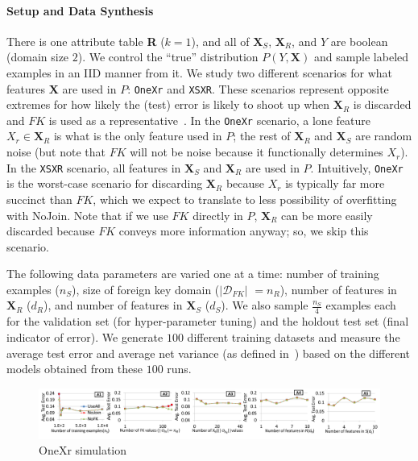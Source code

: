 \documentclass[sigconf]{acmart}
\begin{document}
\paragraph*{Setup and Data Synthesis}
There is one attribute table \textbf{R} ($k=1$), and all of $\textbf{X}_S$, $\textbf{X}_R$, and $Y$ are boolean (domain size $2$).
We control the ``true'' distribution $P(Y,\textbf{X})$ and sample labeled examples in an IID manner from it.
We study two different scenarios for what features \textbf{X} are used in $P$: \texttt{OneXr} and \texttt{XSXR}.
These scenarios represent opposite extremes for how likely the (test) error is likely to shoot up when $\textbf{X}_R$ is discarded
and $FK$ is used as a representative~\cite{hamlet}. In the \texttt{OneXr} scenario, a lone feature $X_r \in \textbf{X}_R$ is 
what is the only feature used in $P$; the rest of $\textbf{X}_R$ and $\textbf{X}_S$ are random noise (but note that $FK$ will not 
be noise because it functionally determines $X_r$). In the \texttt{XSXR} scenario, all features in $\textbf{X}_S$ and $\textbf{X}_R$
are used in $P$. Intuitively, \texttt{OneXr} is the worst-case scenario for discarding $\textbf{X}_R$ because $X_r$ is typically 
far more succinct than $FK$, which we expect to translate to less possibility of overfitting with NoJoin. Note that if we use $FK$ 
directly in $P$, $\textbf{X}_R$ can be more easily discarded because $FK$ conveys more information anyway; so, we skip this scenario.

The following data parameters are varied one at a time: number of training examples ($n_S$), size of foreign key domain ($|\mathcal{D}_{FK}|$ $=n_R$),
number of features in $\textbf{X}_R$ ($d_R$), and number of features in $\textbf{X}_S$ ($d_S$). We also sample $\frac{n_S}{4}$ examples each for the 
validation set (for hyper-parameter tuning) and the holdout test set (final indicator of error).
We generate $100$ different training datasets and measure the average test error and average net variance (as defined in~\cite{pedrobvd}) 
based on the different models obtained from these $100$ runs.


\begin{figure}
\centering
\includegraphics[width=2\columnwidth,height=\textheight,keepaspectratio]{onexr.png}
\caption{OneXr simulation}
\label{Figure:OneXrSimulation}
\end{figure}
\end{document}
